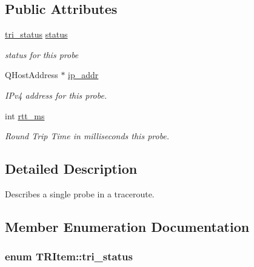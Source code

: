 \subsection*{Public Attributes}
\begin{CompactItemize}
\item 
\hypertarget{classTRItem_71c41b17d015ce9e9cb76582b780ff40}{
\hyperlink{classTRItem_0514afbd69abf71a2d996386a1658c7b}{tri\_\-status} \hyperlink{classTRItem_71c41b17d015ce9e9cb76582b780ff40}{status}}
\label{classTRItem_71c41b17d015ce9e9cb76582b780ff40}

\begin{CompactList}\small\item\em status for this probe \item\end{CompactList}\item 
\hypertarget{classTRItem_42a994228df002a4ab4f0f51df0128d2}{
QHostAddress $\ast$ \hyperlink{classTRItem_42a994228df002a4ab4f0f51df0128d2}{ip\_\-addr}}
\label{classTRItem_42a994228df002a4ab4f0f51df0128d2}

\begin{CompactList}\small\item\em IPv4 address for this probe. \item\end{CompactList}\item 
\hypertarget{classTRItem_8288ea073bd9d5c3daa68c8f9c782477}{
int \hyperlink{classTRItem_8288ea073bd9d5c3daa68c8f9c782477}{rtt\_\-ms}}
\label{classTRItem_8288ea073bd9d5c3daa68c8f9c782477}

\begin{CompactList}\small\item\em Round Trip Time in milliseconds this probe. \item\end{CompactList}\end{CompactItemize}


\subsection{Detailed Description}
Describes a single probe in a traceroute. 

\subsection{Member Enumeration Documentation}
\hypertarget{classTRItem_0514afbd69abf71a2d996386a1658c7b}{
\subsubsection[tri\_\-status]{\setlength{\rightskip}{0pt plus 5cm}enum {\bf TRItem::tri\_\-status}}}
\label{classTRItem_0514afbd69abf71a2d996386a1658c7b}


